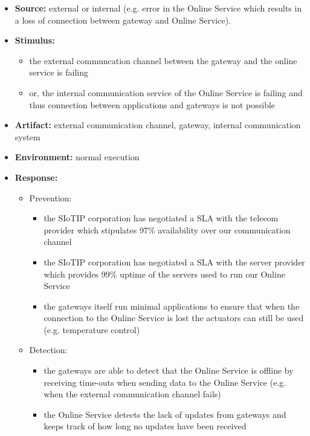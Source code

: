 \documentclass[english]{sareport}
\begin{document}
\begin{itemize}
    \item \textbf{Source:} external or internal (e.g. error in the Online Service which results in a loss of connection between gateway and Online Service).
    \item \textbf{Stimulus:}
        \begin{itemize}
            \item the external communcation channel between the gateway and the online service is failing
            \item or, the internal communication service of the Online Service is failing and thus connection between applications and gateways is not possible
        \end{itemize}

    \item \textbf{Artifact:} external communication channel, gateway, internal communication system
    \item \textbf{Environment:} normal execution
    \item \textbf{Response:}
        \begin{itemize}
            \item Prevention:
            \begin{itemize}
            	\item the SIoTIP corporation has negotiated a SLA with the telecom provider which stipulates 97\% availability over our communication channel 
            	\item the SIoTIP corporation has negotiated a SLA with the server provider which provides 99\% uptime of the servers used to run our Online Service
            	\item the gateways itself run minimal applications to ensure that when the connection to the Online Service is lost the actuators can still be used (e.g. temperature control)
            \end{itemize}
            \item Detection:
            \begin{itemize}
            	\item the gateways are able to detect that the Online Service is offline by receiving time-outs when sending data to the Online Service (e.g. when the external communication channel fails)
            	\item the Online Service detects the lack of updates from gateways and keeps track of how long no updates have been received
            \end{itemize}

\end{itemize}
\end{itemize}
\end{document}

